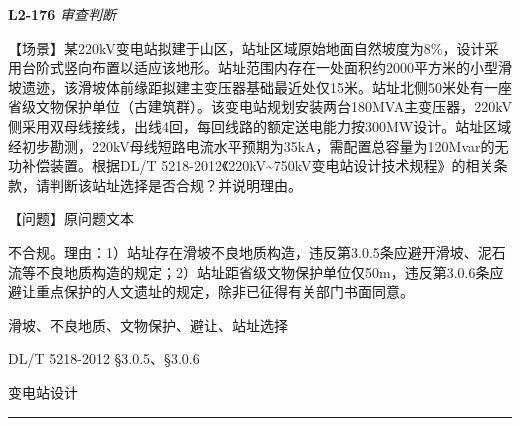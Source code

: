 \documentclass[12pt,a4paper]{ctexart}
\begin{document}
\noindent\textbf{L2-176} \hfill \textit{审查判断}
\begin{description}[leftmargin=1.5em,style=nextline,font=\normalfont]
  \item[Q:] 【场景】某220kV变电站拟建于山区，站址区域原始地面自然坡度为8\%，设计采用台阶式竖向布置以适应该地形。站址范围内存在一处面积约2000平方米的小型滑坡遗迹，该滑坡体前缘距拟建主变压器基础最近处仅15米。站址北侧50米处有一座省级文物保护单位（古建筑群）。该变电站规划安装两台180MVA主变压器，220kV侧采用双母线接线，出线4回，每回线路的额定送电能力按300MW设计。站址区域经初步勘测，220kV母线短路电流水平预期为35kA，需配置总容量为120Mvar的无功补偿装置。根据DL/T 5218-2012《220kV\textasciitilde{}750kV变电站设计技术规程》的相关条款，请判断该站址选择是否合规？并说明理由。

【问题】原问题文本
  \item[A:] 不合规。理由：1）站址存在滑坡不良地质构造，违反第3.0.5条应避开滑坡、泥石流等不良地质构造的规定；2）站址距省级文物保护单位仅50m，违反第3.0.6条应避让重点保护的人文遗址的规定，除非已征得有关部门书面同意。
  \item[KW:] 滑坡、不良地质、文物保护、避让、站址选择
  \item[Std:] DL/T 5218-2012 §3.0.5、§3.0.6
  \item[Topic:] 变电站设计
\end{description}
\vspace{4pt}
\hrule\vspace{6pt}
\end{document}
